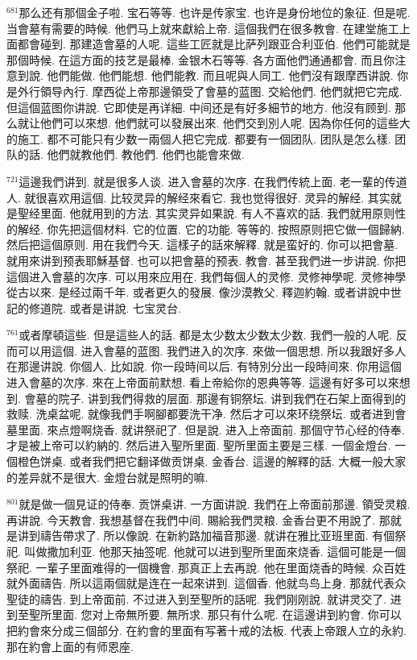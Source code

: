 \documentclass{book}
\begin{document}
$^{681}$那么还有那個金子啦.
宝石等等.
也许是传家宝.
也许是身份地位的象征.
但是呢.
当會墓有需要的時候.
他們马上就來獻給上帝.
這個我們在很多教會.
在建堂施工上面都會碰到.
那建造會墓的人呢.
這些工匠就是比萨列跟亚合利亚伯.
他們可能就是那個時候.
在這方面的技艺是最棒.
金银木石等等.
各方面他們通通都會.
而且你注意到說.
他們能做.
他們能想.
他們能教.
而且呢與人同工.
他們沒有跟摩西讲說.
你是外行領导內行.
摩西從上帝那邊領受了會墓的蓝图.
交給他們.
他們就把它完成.
但這個蓝图你讲說.
它即使是再详細.
中间还是有好多細节的地方.
他沒有顾到.
那么就让他們可以來想.
他們就可以發展出來.
他們交到別人呢.
因為你任何的這些大的施工.
都不可能只有少数一兩個人把它完成.
都要有一個团队.
团队是怎么樣.
团队的話.
他們就教他們.
教他們.
他們也能會來做.

$^{721}$這邊我們讲到.
就是很多人谈.
进入會墓的次序.
在我們传統上面.
老一輩的传道人.
就很喜欢用這個.
比较灵异的解经來看它.
我也觉得很好.
灵异的解经.
其实就是聖经里面.
他就用到的方法.
其实灵异如果說.
有人不喜欢的話.
我們就用原则性的解经.
你先把這個材料.
它的位置.
它的功能.
等等的.
按照原则把它做一個歸納.
然后把這個原则.
用在我們今天.
這樣子的話來解釋.
就是蛮好的.
你可以把會墓.
就用來讲到预表耶穌基督.
也可以把會墓的预表.
教會.
甚至我們进一步讲說.
你把這個进入會墓的次序.
可以用來应用在.
我們每個人的灵修.
灵修神學呢.
灵修神學從古以來.
是经过兩千年.
或者更久的發展.
像沙漠教父.
釋迦約翰.
或者讲說中世記的修道院.
或者是讲說.
七宝灵台.

$^{761}$或者摩頓這些.
但是這些人的話.
都是太少数太少数太少数.
我們一般的人呢.
反而可以用這個.
进入會墓的蓝图.
我們进入的次序.
來做一個思想.
所以我跟好多人在那邊讲說.
你個人.
比如說.
你一段時间以后.
有特別分出一段時间來.
你用這個进入會墓的次序.
來在上帝面前默想.
看上帝給你的恩典等等.
這邊有好多可以來想到.
會墓的院子.
讲到我們得救的层面.
那邊有铜祭坛.
讲到我們在石架上面得到的救赎.
洗桌盆呢.
就像我們手啊腳都要洗干净.
然后才可以來环绕祭坛.
或者进到會墓里面.
來点燈啊烧香.
就讲祭祀了.
但是說.
进入上帝面前.
那個守节心经的侍奉.
才是被上帝可以約納的.
然后进入聖所里面.
聖所里面主要是三樣.
一個金燈台.
一個橙色饼桌.
或者我們把它翻译做贡饼桌.
金香台.
這邊的解釋的話.
大概一般大家的差异就不是很大.
金燈台就是照明的嘛.

$^{801}$就是做一個見证的侍奉.
贡饼桌讲.
一方面讲說.
我們在上帝面前那邊.
領受灵粮.
再讲說.
今天教會.
我想基督在我們中间.
賜給我們灵粮.
金香台更不用說了.
那就是讲到禱告帶求了.
所以像說.
在新約路加福音那邊.
就讲在雅比亚班里面.
有個祭祀.
叫做撒加利亚.
他那天抽签呢.
他就可以进到聖所里面來烧香.
這個可能是一個祭祀.
一輩子里面难得的一個機會.
那真正上去再說.
他在里面烧香的時候.
众百姓就外面禱告.
所以這兩個就是连在一起來讲到.
這個香.
他就鸟鸟上身.
那就代表众聖徒的禱告.
到上帝面前.
不过进入到至聖所的話呢.
我們刚刚說.
就讲灵交了.
进到至聖所里面.
您对上帝無所要.
無所求.
那只有什么呢.
在這邊讲到約會.
你可以把約會來分成三個部分.
在約會的里面有写著十戒的法板.
代表上帝跟人立的永約.
那在約會上面的有师恩座.
\end{document}
